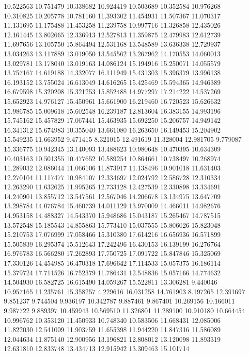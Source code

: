 10.522563
10.751479
10.338682
10.924419
10.503689
10.352584
10.976268
10.310825
10.205778
10.781160
11.393302
11.454931
11.507367
11.070317
11.131695
11.175488
11.453258
11.239758
10.997716
11.326858
12.435026
12.161445
13.802665
12.336913
12.527813
11.359875
12.479983
12.612739
11.697656
13.105750
15.864494
12.531168
13.548589
13.636338
12.729937
13.034263
13.117889
13.019050
13.545562
13.267962
14.170553
14.060013
13.029781
13.178040
13.019163
14.086124
15.194916
15.250071
14.055579
13.757167
14.619188
14.332077
16.111949
15.431303
15.396379
13.996138
16.193152
13.755024
16.613049
14.616265
15.425469
15.594365
14.946389
16.679598
15.320208
15.321253
15.852488
14.977297
17.214222
14.537269
15.652923
14.976127
15.450961
15.661900
16.219460
16.720523
15.626632
15.986785
15.009618
15.602548
16.239187
12.813604
16.383155
14.993196
15.745162
15.457829
17.067441
15.463935
15.692250
15.206757
14.949142
16.341312
15.674983
10.355040
13.661080
16.263650
16.149453
15.204902
15.549235
11.663952
9.471415
8.321015
12.491619
11.328004
12.981705
9.779087
15.336775
10.942345
13.140093
13.488623
10.980648
10.470395
10.634309
10.403163
10.501355
10.477652
10.589254
10.864661
10.738497
10.268974
11.289032
12.086044
11.066106
11.873917
11.138496
10.901018
11.631403
12.270104
11.117477
10.984107
12.334697
12.024792
12.586728
12.310334
12.263290
11.632625
11.995265
12.733128
12.427539
12.330898
13.334691
14.240901
13.855712
13.547561
12.567046
14.206678
13.134975
13.647709
13.298784
14.076784
15.460739
14.011129
13.970009
14.466011
14.982676
14.953158
14.488327
14.543370
15.948686
15.043187
15.265467
14.787515
13.572548
15.185543
14.855863
15.773410
15.037555
15.806026
15.823048
15.210753
17.076999
17.058466
15.310380
17.614216
16.656936
16.571899
15.505839
16.295374
15.512643
17.242496
16.430153
16.139199
16.276764
16.976783
16.566280
17.262893
17.750725
17.091722
15.847846
15.325069
17.330126
14.454985
16.470318
17.696642
17.114533
15.057375
16.186114
15.379724
17.711526
16.752379
11.786431
12.548836
15.057166
14.774632
14.504930
16.582725
16.615490
14.059267
15.522811
13.306281
9.440046
10.957165
11.235761
15.358257
4.229616
16.031258
14.761903
8.197265
12.391697
9.851237
9.744504
9.936197
10.342787
9.887461
9.867401
10.269156
10.166011
9.987722
9.889397
10.459943
10.569510
11.326801
11.289100
10.910180
10.664454
10.996762
10.353120
11.450933
10.748340
10.583506
11.668431
12.085006
11.822030
12.541009
11.903759
11.655398
11.944220
11.847316
11.586089
12.044634
11.875140
12.900956
13.196821
12.808012
13.120098
11.893319
12.631810
12.833748
13.434713
12.915942
13.309463
15.101714
